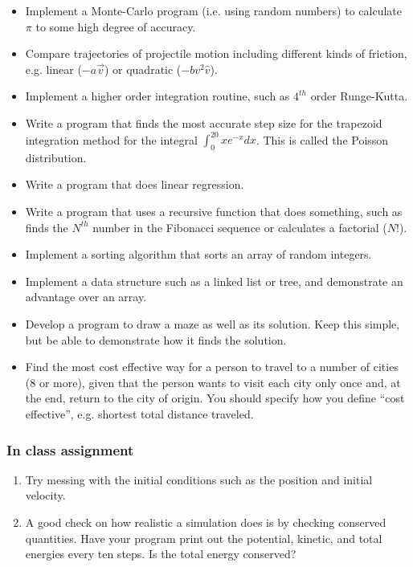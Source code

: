 \documentclass{beamer}
\begin{document}
\begin{frame}[allowframebreaks]
\begin{itemize}
  \item Implement a Monte-Carlo program (i.e. using random numbers) to
    calculate $\pi$ to some high degree of accuracy.
  \item Compare trajectories of projectile motion including different
    kinds of friction, e.g. linear ($-a\vec{v}$) or quadratic ($-bv^2\hat{v}$).
  \item Implement a higher order integration routine, such as $4^{th}$ order 
    Runge-Kutta.
  \item Write a program that finds the most accurate step size for
    the trapezoid integration method for the integral 
    $\int_0^{20}xe^{-x}dx$. 
    This is called the Poisson distribution.
  \item Write a program that does linear regression.
  \item Write a program that uses a recursive function that does something,
    such as finds the $N^{th}$ number in the Fibonacci sequence or calculates
    a factorial ($N!$).
  \item Implement a sorting algorithm that sorts an array of random
    integers.
  \item Implement a data structure such as a linked list or tree, and 
    demonstrate an advantage over an array.
  \item Develop a program to draw a maze as well as its solution. Keep this
    simple, but be able to demonstrate how it finds the solution.
  \item Find the most cost effective way for a person to travel to a number
    of cities (8 or more), given that the person wants to visit each city
    only once and, at the end, return to the city of origin. You should
    specify how you define ``cost effective'', e.g. shortest total distance
    traveled.
  \end{itemize}
\end{frame}

\begin{frame}
  \frametitle{In class assignment}
  \begin{enumerate}
    \item Try messing with the initial conditions such as the position and
      initial velocity.
    \item A good check on how realistic a simulation does 
      is by checking conserved
      quantities. Have your program print out the potential, kinetic, and
      total energies
      every ten steps. Is the total energy conserved?
  \end{enumerate}
\end{frame}
\end{document}
